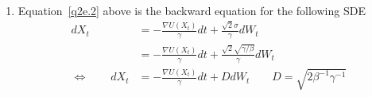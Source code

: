 \documentclass[12pt]{article}
\theoremstyle{plain}
\theoremstyle{definition}
\theoremstyle{remark}
\begin{document}
\begin{enumerate}
\begin{enumerate}
      \item %
        Equation~\ref{q2e.2} above is the backward equation for the following SDE
        \begin{align*}
          dX_t
          &=
          - \frac{\nabla U(X_t)}{\gamma} dt
          + \frac{\sqrt{2}\sigma}{\gamma} dW_t \\
          &=
          - \frac{\nabla U(X_t)}{\gamma} dt
          + \frac{\sqrt{2}\sqrt{\gamma/\beta}}{\gamma} dW_t \\
          \Leftrightarrow \qquad
          dX_t &=
          - \frac{\nabla U(X_t)}{\gamma} dt
          + D dW_t
          \qquad D = \sqrt{2\beta^{-1}\gamma^{-1}}
        \end{align*}

    \end{enumerate}




\end{enumerate}
\end{document}
